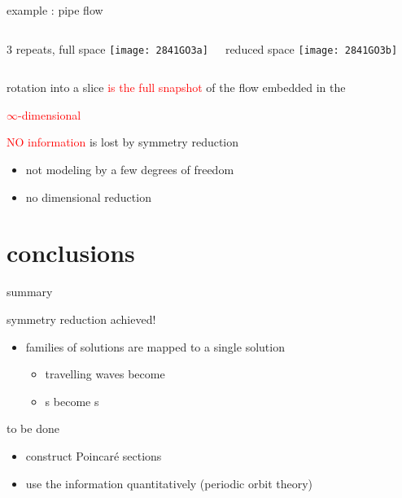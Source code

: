 \begin{frame}{example : pipe flow \rpo}
  \begin{columns}
\begin{block}{3 repeats, full space}
\texttt{[image: 2841GO3a]}%
\end{block}
\begin{block}{reduced space}
\texttt{[image: 2841GO3b]}%
\end{block}
  \end{columns}
\end{frame}

\begin{frame}{}
rotation into a slice \textcolor{red}{is the full snapshot}
 of the flow embedded in the

\begin{center}
\textcolor{red}{\Large $\infty$-dimensional \statesp}
\end{center}

\bigskip\bigskip
\textcolor{red}{\Large NO information} is lost by symmetry reduction
\begin{itemize}
  \item not modeling by a few degrees of freedom
  \item no dimensional reduction
\end{itemize}
\end{frame}

\section[Summary]{conclusions}


\begin{frame}{summary}
\begin{block}{symmetry reduction achieved!}
\begin{itemize}
 \item families of solutions are mapped to a single solution
    \begin{itemize}
 \item travelling waves become \eqva
 \item \rpo s become \po s
    \end{itemize}
\end{itemize}
\end{block}

\begin{block}{to be done}
\begin{itemize}
  \item construct Poincar\'e sections
  \item use the information quantitatively (periodic orbit theory)
\end{itemize}
\end{block}
\end{frame}

